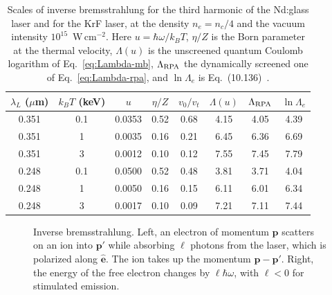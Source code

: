 \documentclass[11pt]{article}
\numberwithin{equation}{section}
\newcommand{\ehat}{\hat{\mathbf e}}
\newcommand{\pv}{\mathbf p}
\newcommand{\kB}{k_B}
\begin{document}
\begin{table}[ht]
\centering
\caption{Scales of inverse bremsstrahlung for the third harmonic of the
Nd:glass laser and for the KrF laser, at the density $n_e=n_c/4$ and the
vacuum intensity $10^{15}$~W\,cm$^{-2}$. Here $u=\hbar\omega/\kB T$, $\eta/Z$ is
the Born parameter at the thermal velocity, $\Lambda(u)$ is the unscreened
quantum Coulomb logarithm of Eq.~\eqref{eq:Lambda-mb}, $\Lambda_{\rm RPA}$ the
dynamically screened one of Eq.~\eqref{eq:Lambda-rpa}, and $\ln\Lambda_e$ is
Eq.~(10.136)~\cite{Atzeni2004}.}
\label{tab:scales}
\begin{tabular}{cccccccc}
\toprule
$\lambda_L$ ($\mu$m) & $\kB T$ (keV) & $u$ & $\eta/Z$ & $v_0/v_t$ & $\Lambda(u)$ & $\Lambda_{\rm RPA}$ & $\ln\Lambda_e$ \\
\midrule
0.351 & 0.1 & 0.0353 & 0.52 & 0.68 & 4.15 & 4.05 & 4.39\\
0.351 & 1   & 0.0035 & 0.16 & 0.21 & 6.45 & 6.36 & 6.69\\
0.351 & 3   & 0.0012 & 0.10 & 0.12 & 7.55 & 7.45 & 7.79\\
0.248 & 0.1 & 0.0500 & 0.52 & 0.48 & 3.81 & 3.71 & 4.04\\
0.248 & 1   & 0.0050 & 0.16 & 0.15 & 6.11 & 6.01 & 6.34\\
0.248 & 3   & 0.0017 & 0.10 & 0.09 & 7.21 & 7.11 & 7.44\\
\bottomrule
\end{tabular}
\end{table}

\begin{figure}[ht]
\centering
{}
\caption{Inverse bremsstrahlung. Left, an electron of momentum $\pv$
scatters on an ion into $\pv'$ while absorbing $\ell$ photons from the laser,
which is polarized along $\ehat$. The ion takes up the momentum
$\pv-\pv'$. Right, the energy of the free electron changes by $\ell\hbar\omega$,
with $\ell<0$ for stimulated emission.}
\label{fig:process}
\end{figure}
\end{document}
